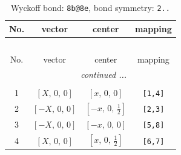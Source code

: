 \documentclass[fleqn,8pt]{jsarticle}
\begin{document}
\renewcommand{\arraystretch}{1.2}
\begin{longtable}{cccc}
\caption{Wyckoff bond: {\tt 8b@8e}, bond symmetry: {\tt 2..}}
 \\
 \hline \hline
No. & vector & center & mapping \\ \hline \endfirsthead

\multicolumn{3}{l}{\tablename\ \thetable{}} \\
 \hline \hline
No. & vector & center & mapping \\ \hline \endhead

 \hline \hline
\multicolumn{3}{r}{\footnotesize\it continued ...} \\ \endfoot

 \hline \hline
\multicolumn{3}{r}{} \\ \endlastfoot

1 & $\left[ X,\, 0,\, 0 \right]$ & $\left[ x,\, 0,\, 0 \right]$ & {\tt [1,4]} \\ \hline
2 & $\left[ - X,\, 0,\, 0 \right]$ & $\left[ - x,\, 0,\, \frac{1}{2} \right]$ & {\tt [2,3]} \\ \hline
3 & $\left[ - X,\, 0,\, 0 \right]$ & $\left[ - x,\, 0,\, 0 \right]$ & {\tt [5,8]} \\ \hline
4 & $\left[ X,\, 0,\, 0 \right]$ & $\left[ x,\, 0,\, \frac{1}{2} \right]$ & {\tt [6,7]} \\
\end{longtable}
\renewcommand{\arraystretch}{1.2}
\end{document}
